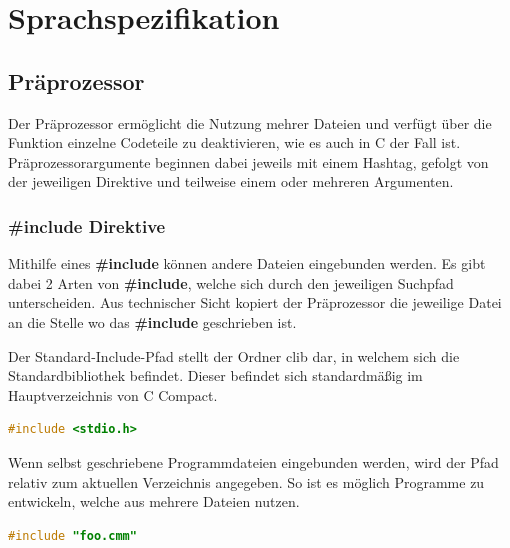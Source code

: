 

\newpage
\section{Sprachspezifikation}

\subsection{Pr\"aprozessor}

Der Pr\"aprozessor erm\"oglicht die Nutzung mehrer Dateien und verf\"ugt \"uber die Funktion einzelne Codeteile zu deaktivieren, wie es auch in C der Fall ist. Pr\"aprozessorargumente beginnen dabei jeweils mit einem Hashtag, gefolgt von der jeweiligen Direktive und teilweise einem oder mehreren Argumenten.

\subsubsection{\#include Direktive}

Mithilfe eines \textbf{\#include} k\"onnen andere Dateien eingebunden werden. Es gibt dabei 2 Arten von \textbf{\#include}, welche sich durch den jeweiligen Suchpfad unterscheiden. Aus technischer Sicht kopiert der Pr\"aprozessor die jeweilige Datei an die Stelle wo das \textbf{\#include} geschrieben ist.


Der Standard-Include-Pfad stellt der Ordner clib dar, in welchem sich die Standardbibliothek befindet. Dieser befindet sich standardm\"a\ss{}ig im Hauptverzeichnis von C Compact.

\begin{lstlisting}[language=C]
#include <stdio.h>
\end{lstlisting}


Wenn selbst geschriebene Programmdateien eingebunden werden, wird der Pfad relativ zum aktuellen Verzeichnis angegeben. So ist es m\"oglich Programme zu entwickeln, welche aus mehrere Dateien nutzen.

\begin{lstlisting}[language=C]
#include "foo.cmm"
\end{lstlisting}

